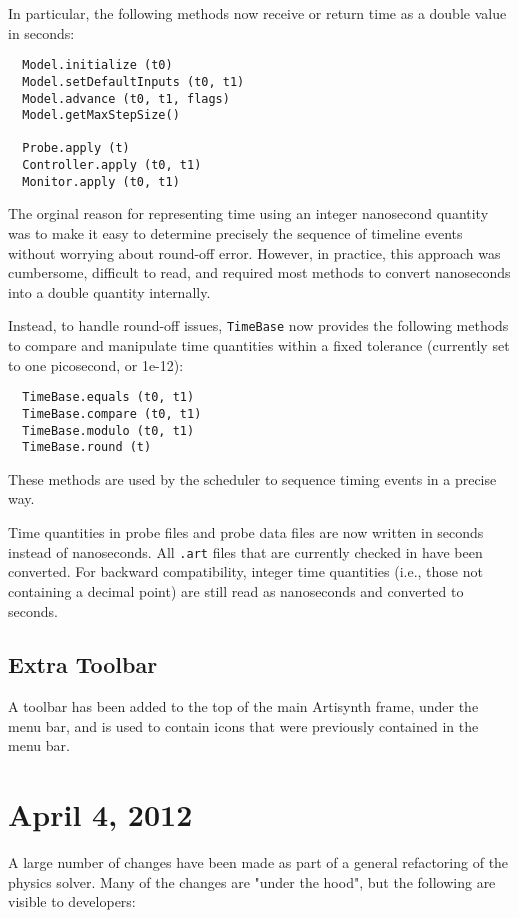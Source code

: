 \documentclass{article}
\begin{document}
In particular, the following methods now receive or return time as a
double value in seconds:
\begin{lstlisting}
  Model.initialize (t0)
  Model.setDefaultInputs (t0, t1)
  Model.advance (t0, t1, flags)
  Model.getMaxStepSize()

  Probe.apply (t)
  Controller.apply (t0, t1)
  Monitor.apply (t0, t1)
\end{lstlisting}

The orginal reason for representing time using an integer nanosecond
quantity was to make it easy to determine precisely the sequence of
timeline events without worrying about round-off error. However, in
practice, this approach was cumbersome, difficult to read, and
required most methods to convert nanoseconds into a double quantity
internally.

Instead, to handle round-off issues, {\tt TimeBase} now provides the
following methods to compare and manipulate time quantities within a
fixed tolerance (currently set to one picosecond, or 1e-12):
\begin{lstlisting}
  TimeBase.equals (t0, t1)
  TimeBase.compare (t0, t1)
  TimeBase.modulo (t0, t1)
  TimeBase.round (t)
\end{lstlisting}
These methods are used by the scheduler to sequence timing events in a
precise way.

Time quantities in probe files and probe data files are now written in
seconds instead of nanoseconds. All {\tt .art} files that are currently
checked in have been converted. For backward compatibility, integer
time quantities (i.e., those not containing a decimal point) are still
read as nanoseconds and converted to seconds.

\subsection*{Extra Toolbar}

A toolbar has been added to the top of the main Artisynth frame, under
the menu bar, and is used to contain icons that were previously
contained in the menu bar. 

\section*{April 4, 2012}

A large number of changes have been made as part of a general
refactoring of the physics solver. Many of the changes are "under the
hood", but the following are visible to developers:
\end{document}
